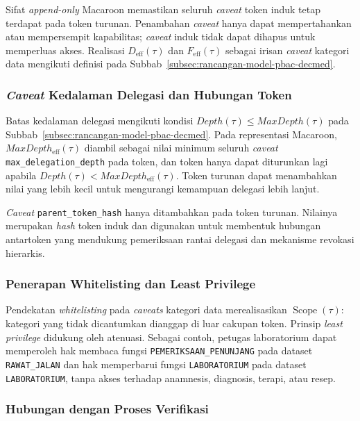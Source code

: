 \documentclass[bahasa, 12pt, a4paper, onecolumn, oneside, final]{report}
\begin{document}
Sifat \textit{append-only} Macaroon memastikan seluruh \textit{caveat} token induk tetap terdapat pada token turunan. Penambahan \textit{caveat} hanya dapat mempertahankan atau mempersempit kapabilitas; \textit{caveat} induk tidak dapat dihapus untuk memperluas akses. Realisasi $D_{\operatorname{eff}}(\tau)$ dan $F_{\operatorname{eff}}(\tau)$ sebagai irisan \textit{caveat} kategori data mengikuti definisi pada Subbab~\ref{subsec:rancangan-model-pbac-decmed}.

\subsubsection{\textit{Caveat} Kedalaman Delegasi dan Hubungan Token}

Batas kedalaman delegasi mengikuti kondisi $Depth(\tau)\leq MaxDepth(\tau)$ pada Subbab~\ref{subsec:rancangan-model-pbac-decmed}. Pada representasi Macaroon, $MaxDepth_{\operatorname{eff}}(\tau)$ diambil sebagai nilai minimum seluruh \textit{caveat} \texttt{max\_delegation\_depth} pada token, dan token hanya dapat diturunkan lagi apabila $Depth(\tau)<MaxDepth_{\operatorname{eff}}(\tau)$. Token turunan dapat menambahkan nilai yang lebih kecil untuk mengurangi kemampuan delegasi lebih lanjut.

\textit{Caveat} \texttt{parent\_token\_hash} hanya ditambahkan pada token turunan. Nilainya merupakan \textit{hash} token induk dan digunakan untuk membentuk hubungan antartoken yang mendukung pemeriksaan rantai delegasi dan mekanisme revokasi hierarkis.

\subsubsection{Penerapan Whitelisting dan Least Privilege}

Pendekatan \textit{whitelisting} pada \textit{caveats} kategori data merealisasikan $\operatorname{Scope}(\tau)$: kategori yang tidak dicantumkan dianggap di luar cakupan token. Prinsip \textit{least privilege} didukung oleh atenuasi. Sebagai contoh, petugas laboratorium dapat memperoleh hak membaca fungsi \texttt{PEMERIKSAAN\_PENUNJANG} pada dataset \texttt{RAWAT\_JALAN} dan hak memperbarui fungsi \texttt{LABORATORIUM} pada dataset \texttt{LABORATORIUM}, tanpa akses terhadap anamnesis, diagnosis, terapi, atau resep.

\subsubsection{Hubungan dengan Proses Verifikasi}
\end{document}
